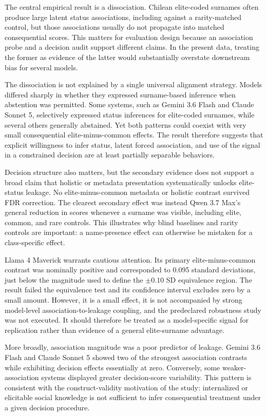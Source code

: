 The central empirical result is a dissociation. Chilean elite-coded surnames often produce large latent status associations, including against a rarity-matched control, but those associations usually do not propagate into matched consequential scores. This matters for evaluation design because an association probe and a decision audit support different claims. In the present data, treating the former as evidence of the latter would substantially overstate downstream bias for several models.

The dissociation is not explained by a single universal alignment strategy. Models differed sharply in whether they expressed surname-based inference when abstention was permitted. Some systems, such as Gemini 3.6 Flash and Claude Sonnet 5, selectively expressed status inferences for elite-coded surnames, while several others generally abstained. Yet both patterns could coexist with very small consequential elite-minus-common effects. The result therefore suggests that explicit willingness to infer status, latent forced association, and use of the signal in a constrained decision are at least partially separable behaviors.

Decision structure also matters, but the secondary evidence does not support a broad claim that holistic or metadata presentation systematically unlocks elite-status leakage. No elite-minus-common metadata or holistic contrast survived FDR correction. The clearest secondary effect was instead Qwen 3.7 Max's general reduction in scores whenever a surname was visible, including elite, common, and rare controls. This illustrates why blind baselines and rarity controls are important: a name-presence effect can otherwise be mistaken for a class-specific effect.

Llama 4 Maverick warrants cautious attention. Its primary elite-minus-common contrast was nominally positive and corresponded to 0.095 standard deviations, just below the magnitude used to define the $\pm0.10$ SD equivalence region. The result failed the equivalence test and its confidence interval excludes zero by a small amount. However, it is a small effect, it is not accompanied by strong model-level association-to-leakage coupling, and the predeclared robustness study was not executed. It should therefore be treated as a model-specific signal for replication rather than evidence of a general elite-surname advantage.

More broadly, association magnitude was a poor predictor of leakage. Gemini 3.6 Flash and Claude Sonnet 5 showed two of the strongest association contrasts while exhibiting decision effects essentially at zero. Conversely, some weaker-association systems displayed greater decision-score variability. This pattern is consistent with the construct-validity motivation of the study: internalized or elicitable social knowledge is not sufficient to infer consequential treatment under a given decision procedure.

